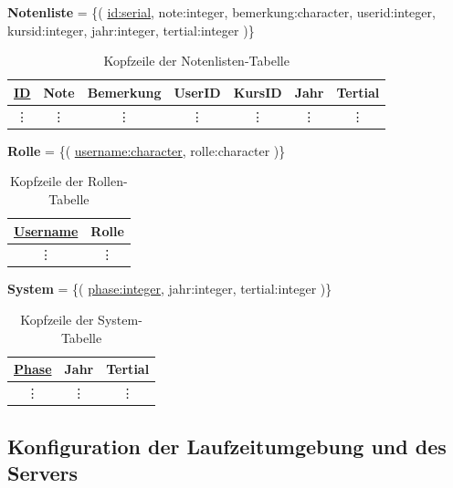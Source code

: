 \documentclass[12pt, twoside, a4paper, ngerman]{article}
\begin{document}
\textbf{Notenliste} = \{( \underline{id:serial}, note:integer, bemerkung:character, userid:integer, kursid:integer, jahr:integer, tertial:integer )\}

\begin{table}[H]
\begin{center}
	\begin{tabular}{|c|c|c|c|c|c|c|}\hline
		\textbf{\underline{ID}} & \textbf{Note} & \textbf{Bemerkung} & \textbf{UserID} & \textbf{KursID} & \textbf{Jahr} & \textbf{Tertial}\\ \hline
		\vdots & \vdots & \vdots & \vdots & \vdots & \vdots & \vdots  \\
	\end{tabular}
	\caption{Kopfzeile der Notenlisten-Tabelle}
\end{center}
\end{table}

\textbf{Rolle} = \{( \underline{username:character}, rolle:character )\}

\begin{table}[H]
\begin{center}
	\begin{tabular}{|c|c|}\hline
		\textbf{\underline{Username}} & \textbf{Rolle} \\ \hline
		\vdots & \vdots \\
	\end{tabular}
	\caption{Kopfzeile der Rollen-Tabelle}
\end{center}
\end{table}

\textbf{System} = \{( \underline{phase:integer}, jahr:integer, tertial:integer )\}

\begin{table}[H]
\begin{center}
	\begin{tabular}{|c|c|c|}\hline
		\textbf{\underline{Phase}} & \textbf{Jahr} & \textbf{Tertial} \\ \hline
		\vdots & \vdots & \vdots \\
	\end{tabular}
	\caption{Kopfzeile der System-Tabelle}
\end{center}
\end{table}

\subsection{Konfiguration der Laufzeitumgebung und des Servers}\label{subsec:Konfiguration der Laufzeitumgebung und des Server}
\end{document}
